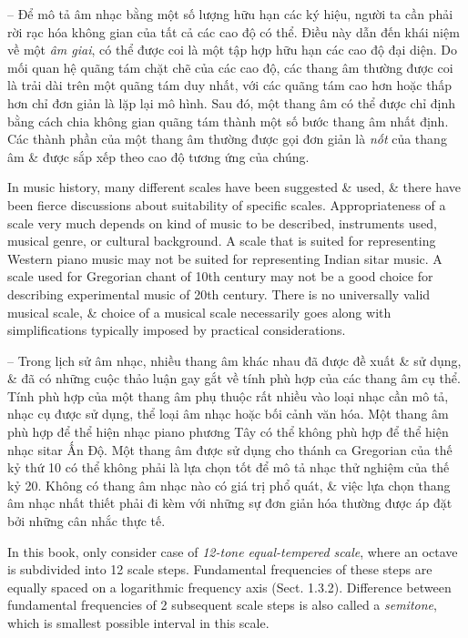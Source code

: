 \documentclass{article}
\begin{document}
\begin{itemize}
\begin{itemize}
\begin{itemize}
			-- Để mô tả âm nhạc bằng một số lượng hữu hạn các ký hiệu, người ta cần phải rời rạc hóa không gian của tất cả các cao độ có thể. Điều này dẫn đến khái niệm về một {\it âm giai}, có thể được coi là một tập hợp hữu hạn các cao độ đại diện. Do mối quan hệ quãng tám chặt chẽ của các cao độ, các thang âm thường được coi là trải dài trên một quãng tám duy nhất, với các quãng tám cao hơn hoặc thấp hơn chỉ đơn giản là lặp lại mô hình. Sau đó, một thang âm có thể được chỉ định bằng cách chia không gian quãng tám thành một số bước thang âm nhất định. Các thành phần của một thang âm thường được gọi đơn giản là {\it nốt} của thang âm \& được sắp xếp theo cao độ tương ứng của chúng.
			
			In music history, many different scales have been suggested \& used, \& there have been fierce discussions about suitability of specific scales. Appropriateness of a scale very much depends on kind of music to be described, instruments used, musical genre, or cultural background. A scale that is suited for representing Western piano music may not be suited for representing Indian sitar music. A scale used for Gregorian chant of 10th century may not be a good choice for describing experimental music of 20th century. There is no universally valid musical scale, \& choice of a musical scale necessarily goes along with simplifications typically imposed by practical considerations.
			
			-- Trong lịch sử âm nhạc, nhiều thang âm khác nhau đã được đề xuất \& sử dụng, \& đã có những cuộc thảo luận gay gắt về tính phù hợp của các thang âm cụ thể. Tính phù hợp của một thang âm phụ thuộc rất nhiều vào loại nhạc cần mô tả, nhạc cụ được sử dụng, thể loại âm nhạc hoặc bối cảnh văn hóa. Một thang âm phù hợp để thể hiện nhạc piano phương Tây có thể không phù hợp để thể hiện nhạc sitar Ấn Độ. Một thang âm được sử dụng cho thánh ca Gregorian của thế kỷ thứ 10 có thể không phải là lựa chọn tốt để mô tả nhạc thử nghiệm của thế kỷ 20. Không có thang âm nhạc nào có giá trị phổ quát, \& việc lựa chọn thang âm nhạc nhất thiết phải đi kèm với những sự đơn giản hóa thường được áp đặt bởi những cân nhắc thực tế.
			
			In this book, only consider case of {\it12-tone equal-tempered scale}, where an octave is subdivided into 12 scale steps. Fundamental frequencies of these steps are equally spaced on a logarithmic frequency axis (Sect. 1.3.2). Difference between fundamental frequencies of 2 subsequent scale steps is also called a {\it semitone}, which is smallest possible interval in this scale.
			

\end{itemize}
\end{itemize}
\end{itemize}
\end{document}

